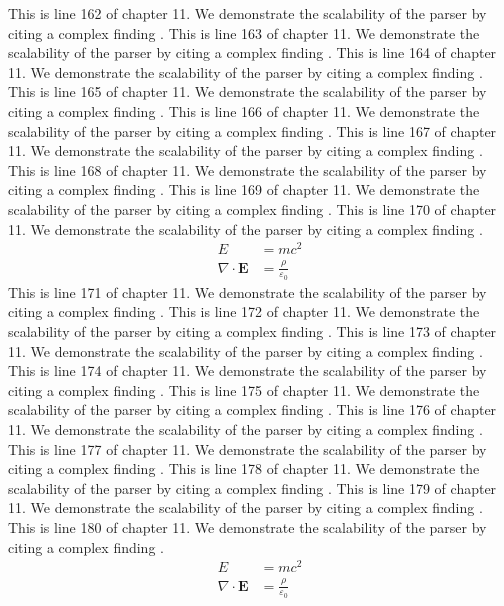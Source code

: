 This is line 162 of chapter 11. We demonstrate the scalability of the parser by citing a complex finding \cite{ref11_162}.
This is line 163 of chapter 11. We demonstrate the scalability of the parser by citing a complex finding \cite{ref11_163}.
This is line 164 of chapter 11. We demonstrate the scalability of the parser by citing a complex finding \cite{ref11_164}.
This is line 165 of chapter 11. We demonstrate the scalability of the parser by citing a complex finding \cite{ref11_165}.
This is line 166 of chapter 11. We demonstrate the scalability of the parser by citing a complex finding \cite{ref11_166}.
This is line 167 of chapter 11. We demonstrate the scalability of the parser by citing a complex finding \cite{ref11_167}.
This is line 168 of chapter 11. We demonstrate the scalability of the parser by citing a complex finding \cite{ref11_168}.
This is line 169 of chapter 11. We demonstrate the scalability of the parser by citing a complex finding \cite{ref11_169}.
This is line 170 of chapter 11. We demonstrate the scalability of the parser by citing a complex finding \cite{ref11_170}.
\begin{align*}
  E &= mc^2 \\
  \nabla \cdot \mathbf{E} &= \frac{\rho}{\varepsilon_0}
\end{align*}
This is line 171 of chapter 11. We demonstrate the scalability of the parser by citing a complex finding \cite{ref11_171}.
This is line 172 of chapter 11. We demonstrate the scalability of the parser by citing a complex finding \cite{ref11_172}.
This is line 173 of chapter 11. We demonstrate the scalability of the parser by citing a complex finding \cite{ref11_173}.
This is line 174 of chapter 11. We demonstrate the scalability of the parser by citing a complex finding \cite{ref11_174}.
This is line 175 of chapter 11. We demonstrate the scalability of the parser by citing a complex finding \cite{ref11_175}.
This is line 176 of chapter 11. We demonstrate the scalability of the parser by citing a complex finding \cite{ref11_176}.
This is line 177 of chapter 11. We demonstrate the scalability of the parser by citing a complex finding \cite{ref11_177}.
This is line 178 of chapter 11. We demonstrate the scalability of the parser by citing a complex finding \cite{ref11_178}.
This is line 179 of chapter 11. We demonstrate the scalability of the parser by citing a complex finding \cite{ref11_179}.
This is line 180 of chapter 11. We demonstrate the scalability of the parser by citing a complex finding \cite{ref11_180}.
\begin{align*}
  E &= mc^2 \\
  \nabla \cdot \mathbf{E} &= \frac{\rho}{\varepsilon_0}
\end{align*}
